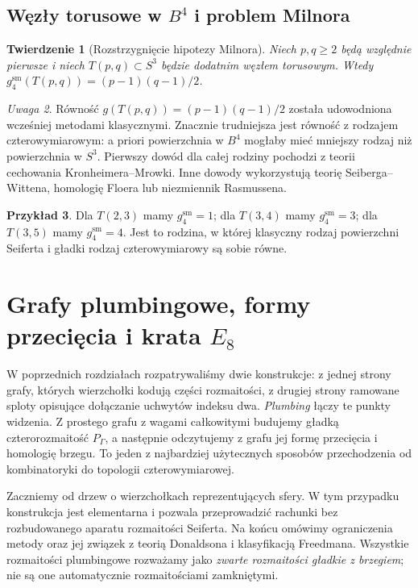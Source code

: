 \documentclass[11pt,a4paper]{report}
\numberwithin{equation}{section}
\theoremstyle{plain}
\newtheorem{twierdzenie}{Twierdzenie}[section]
\theoremstyle{definition}
\newtheorem{przyklad}[twierdzenie]{Przykład}
\theoremstyle{remark}
\newtheorem{uwaga}[twierdzenie]{Uwaga}
\begin{document}
\section{Węzły torusowe w \texorpdfstring{$B^4$}{B4} i problem Milnora}
\label{sec:kt-milnor}

\begin{twierdzenie}[Rozstrzygnięcie hipotezy Milnora]
Niech $p,q\geq2$ będą względnie pierwsze i niech
$T(p,q)\subset S^3$ będzie dodatnim węzłem torusowym.
Wtedy
$g_4^{\mathrm{sm}}(T(p,q))=(p-1)(q-1)/2$.
\end{twierdzenie}

\begin{uwaga}
Równość $g(T(p,q))=(p-1)(q-1)/2$ została udowodniona
wcześniej metodami klasycznymi. Znacznie trudniejsza
jest równość z rodzajem czterowymiarowym: a priori
powierzchnia w $B^4$ mogłaby mieć mniejszy rodzaj niż
powierzchnia w $S^3$. Pierwszy dowód dla całej rodziny
pochodzi z teorii cechowania Kronheimera--Mrowki.
Inne dowody wykorzystują teorię Seiberga--Wittena,
homologię Floera lub niezmiennik Rasmussena.
\end{uwaga}

\begin{przyklad}
Dla $T(2,3)$ mamy $g_4^{\mathrm{sm}}=1$;
dla $T(3,4)$ mamy $g_4^{\mathrm{sm}}=3$;
dla $T(3,5)$ mamy $g_4^{\mathrm{sm}}=4$.
Jest to rodzina, w której klasyczny rodzaj powierzchni
Seiferta i gładki rodzaj czterowymiarowy są sobie równe.
\end{przyklad}



\chapter{Grafy plumbingowe, formy przecięcia i krata \texorpdfstring{$E_8$}{E8}}
\label{ch:tg-plumbing}

W poprzednich rozdziałach rozpatrywaliśmy dwie konstrukcje: z jednej
strony grafy, których wierzchołki kodują części rozmaitości, z drugiej
strony ramowane sploty opisujące dołączanie uchwytów indeksu dwa.
\emph{Plumbing} łączy te punkty widzenia. Z prostego grafu z wagami
całkowitymi budujemy gładką czterorozmaitość $P_\Gamma$, a następnie
odczytujemy z grafu jej formę przecięcia i homologię brzegu.
To jeden z najbardziej użytecznych sposobów przechodzenia od
kombinatoryki do topologii czterowymiarowej.

Zaczniemy od drzew o wierzchołkach reprezentujących sfery. W tym
przypadku konstrukcja jest elementarna i pozwala przeprowadzić
rachunki bez rozbudowanego aparatu rozmaitości Seiferta. Na końcu
omówimy ograniczenia metody oraz jej związek z teorią Donaldsona
i klasyfikacją Freedmana. Wszystkie rozmaitości plumbingowe
rozważamy jako \emph{zwarte rozmaitości gładkie z brzegiem};
nie są one automatycznie rozmaitościami zamkniętymi.
\end{document}
